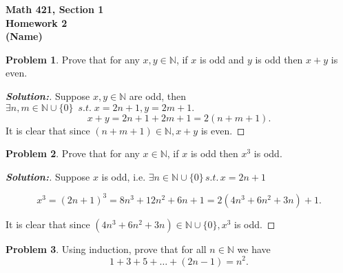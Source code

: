 \documentclass[12pt]{article}
\theoremstyle{definition}\newtheorem{problem}{Problem}
\newenvironment{solution}{\begin{proof}[\bfseries\textup{Solution:}]}{\end{proof}}
\begin{document}

\begin{center}
\bfseries Math 421, Section 1 
\\ 
Homework 2
\\ 
(Name) %
\\ [24pt] 
\end{center}

\begin{problem}
Prove that for any $x,y\in\mathbb{N}$, if $x$ is odd and $y$ is odd then $x+y$ is even.
\end{problem}


\begin{solution} 
    Suppose $ x, y \in \mathbb{N} $ are odd, then $ \exists n, m \in \mathbb{N} \cup \{0\} \ \; s.t. \; x = 2n+1, y = 2m+1. $ 
    \begin{equation}
         x+y = 2 n + 1 + 2 m + 1 = 2(n + m + 1). 
    \end{equation}  
    It is clear that since $ (n + m + 1) \in \mathbb{N}, x+y $ is even.  
\end{solution}

\newpage
\begin{problem}
Prove that for any $x\in\mathbb{N}$, if $x$ is odd then $x^3$ is odd.
\end{problem}
\begin{solution}


Suppose $ x  $ is odd, i.e. $ \exists n \in \mathbb{N} \cup \{0\} \, s.t.\, x=2n+1$ 

\begin{equation} x^3 = (2n+1)^3 = 8n^3 + 12n^2 + 6n + 1 = 2(4n^3 + 6n^2 + 3n) + 1. \end{equation} 

    It is clear that since $ (4n^3 + 6n^2 + 3n) \in \mathbb{N} \cup \{0\}, x^3 $ is odd.

\end{solution} 



\newpage
\begin{problem}
Using induction, prove that for all $n\in\mathbb{N}$ we have
\begin{equation*}
1+3+5+\dots+(2n-1) = n^2 .
\end{equation*}
\end{problem}
\end{document}
